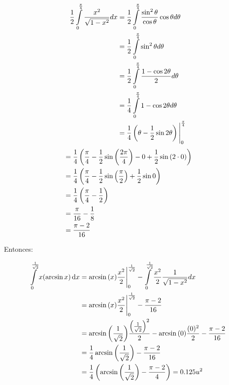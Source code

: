 \documentclass[11pt]{report}
\begin{document}
\begin{align*}
        \frac{1}{2} \int \limits_0^{\frac{\pi}{4}} \frac{x^2}{\sqrt{1 - x^2}} dx \notag
        &= \frac{1}{2} \int \limits_0^{\frac{\pi}{4}} \frac{\sin^2{\theta}}{\cos{\theta}} \cos{\theta} d\theta \\ \notag
        &= \frac{1}{2} \int \limits_0^{\frac{\pi}{4}} \sin^2{\theta} d\theta \\ \notag
        &= \frac{1}{2} \int \limits_0^{\frac{\pi}{4}} \frac{1 - \cos{2\theta}}{2} d\theta \\ \notag
        &= \frac{1}{4} \int \limits_0^{\frac{\pi}{4}} 1 - \cos{2\theta} d\theta \\ \notag
        &= \frac{1}{4} \left( \theta - \frac{1}{2} \sin{2\theta} \right) \Bigg|_0^{\frac{\pi}{4}}
\end{align*}
\begin{align*}
        &= \frac{1}{4} \left( \frac{\pi}{4} - \frac{1}{2}\sin{\left(\frac{2\pi}{4} \right)} - 0 + \frac{1}{2} \sin{(2 \cdot 0)} \right)  \\ \notag
        &= \frac{1}{4} \left( \frac{\pi}{4} - \frac{1}{2}\sin{\left(\frac{\pi}{2} \right)} + \frac{1}{2} \sin{0} \right)  \\ \notag
        &= \frac{1}{4} \left( \frac{\pi}{4} - \frac{1}{2} \right)  \\ \notag
        &= \frac{\pi}{16} - \frac{1}{8}  \\ \notag
        &= \frac{\pi - 2}{16}
\end{align*}

Entonces:

\begin{align*}
        \int \limits_0^{\frac{1}{\sqrt{2}}} x (\arcsin{x}) \, \text dx
        &= \arcsin{(x)} \frac{x^2}{2} \Bigg|_0^{\frac{1}{\sqrt{2}}}
        - \int \limits_0^{\frac{1}{\sqrt{2}}} \frac{x^2}{2} \frac{1}{\sqrt{1 - x^2}} dx \\ \notag
        &= \arcsin{(x)} \frac{x^2}{2} \Bigg|_0^{\frac{1}{\sqrt{2}}} - \frac{\pi - 2}{16} \\ \notag
        &= \arcsin{ \left( \frac{1}{\sqrt{2}} \right)} \frac{ \left( \frac{1}{\sqrt{2}} \right)^2}{2}
        - \arcsin{(0)} \frac{(0)^2}{2} - \frac{\pi - 2}{16} \\ \notag
        &=  \frac{1}{4} \arcsin{ \left( \frac{1}{\sqrt{2}} \right)}
         - \frac{\pi - 2}{16} \\ \notag
        &=  \frac{1}{4} \left( \arcsin{ \left( \frac{1}{\sqrt{2}} \right)}
         - \frac{\pi - 2}{4} \right) = 0.125 u^2 \\ \notag
\end{align*}
\end{document}
